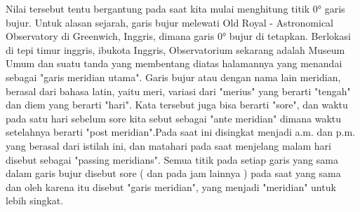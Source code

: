 	Nilai tersebut tentu bergantung pada saat kita mulai menghitung titik 0° garis bujur. Untuk alasan sejarah, garis bujur melewati Old Royal -
	Astronomical Observatory di Greenwich, Inggris, dimana garis 0° bujur di tetapkan. Berlokasi di tepi timur inggris, ibukota Inggris, Observatorium
	sekarang adalah Museum Umum dan suatu tanda yang membentang diatas halamannya yang menandai sebagai "garis meridian utama".
	Garis bujur atau dengan nama lain meridian, berasal dari bahasa latin, yaitu meri, variasi dari "merius" yang berarti "tengah" dan diem yang berarti 
	"hari". Kata tersebut juga bisa berarti "sore", dan waktu pada satu hari sebelum sore kita sebut sebagai "ante meridian" dimana waktu setelahnya berarti 
	"post meridian".Pada saat ini disingkat menjadi a.m. dan p.m. yang berasal dari istilah ini, dan matahari pada saat menjelang malam hari disebut sebagai
	"passing meridians". Semua titik pada setiap garis yang sama dalam garis bujur disebut sore ( dan pada jam lainnya ) pada saat yang sama dan oleh karena 
	itu disebut "garis meridian", yang menjadi "meridian" untuk lebih singkat.
